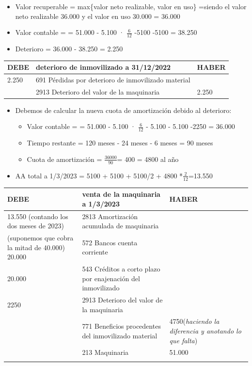 \documentclass[a4paper,12pt]{article}
\newcommand{\fec}{31/12/}
\newcommand{\AAMAQ}{2813 Amortización acumulada de maquinaria }
\newcommand{\valorrecuperable}{Valor recuperable = max\{valor neto realizable, valor en uso\} =}
\newcommand{\PDI}{691 Pérdidas por deterioro de inmovilizado material}
\newcommand{\DVM}{2913 Deterioro del valor de la maquinaria }
\newcommand{\VC}{Valor contable = }
\newcommand{\bancos}{572 Bancos cuenta corriente}
\newcommand{\cuotaamort}{Cuota de amortización = }
\newcommand{\enajenacion}{543 Créditos a corto plazo por enajenación del inmovilizado}
\newcommand{\benefIM}{771 Beneficios procedentes del inmovilizado material}
\newcommand{\myequation}[2]{\ensuremath{\frac{#1}{#2}}}
\begin{document}
\begin{itemize}
    \item \valorrecuperable siendo el valor neto realizable 36.000 y el valor en uso 30.000 = 36.000
    \item \VC = 51.000 - 5.100 · $\frac{6}{12}$ -5100 -5100 = 38.250
    \item Deterioro = 36.000 - 38.250 = 2.250
\end{itemize}

\begin{table}[H]
    \centering
    \begin{tabular}{|p{3cm}|p{6cm}|p{3cm}|}
    \hline
    \textbf{DEBE} & \textbf{deterioro de inmovilizado a \fec2022} & \textbf{HABER} \\
    \hline
    2.250& \PDI& \\
    \hline
    & \DVM & 2.250\\
    \hline
    \end{tabular}
\end{table}

\begin{itemize}
    \item Debemos de calcular la nueva cuota de amortización debido al deterioro:
    \begin{itemize}
        \item \VC = 51.000 - 5.100 · $\frac{6}{12}$ - 5.100 - 5.100 -2250 = 36.000
        \item Tiempo restante = 120 meses - 24 meses - 6 meses = 90 meses
        \item \cuotaamort \myequation{36000}{90}=   400 = 4800 al año 
    \end{itemize}
    \item  AA total a 1/3/2023 = 5100 + 5100 + 5100/2 + 4800 *\myequation{2}{12}=13.550
\end{itemize}



\begin{table}[H]
    \centering
    \begin{tabular}{|p{3cm}|p{6cm}|p{3cm}|}
    \hline
    \textbf{DEBE} & \textbf{venta de la maquinaria a 1/3/2023} & \textbf{HABER} \\
    \hline
    13.550 (contando los dos meses de 2023)& \AAMAQ & \\
    \hline
    (suponemos que cobra la mitad de 40.000) 20.000& \bancos & \\
    \hline
    20.000 & \enajenacion & \\
    \hline
    2250&\DVM &\\
    \hline
    & \benefIM &4750(\textit{haciendo la diferencia y anotando lo que falta})\\
    \hline
    & 213 Maquinaria & 51.000\\
    \hline
    &  & \\
    \hline
    \end{tabular}
\end{table}
\end{document}
